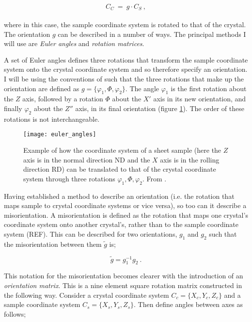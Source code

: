 \documentclass[a4paper,12pt]{report}
\numberwithin{equation}{chapter}
\begin{document}
\begin{equation}
C_C\ =\ g \cdot C_S\ ,
\end{equation}  
\\
where in this case, the sample coordinate system is rotated to that of the crystal. The orientation $g$ can be described in a number of ways. The principal methods I will use are \emph{Euler angles} and \emph{rotation matrices}.


A set of Euler angles defines three rotations that transform the sample coordinate system onto the crystal coordinate system and so therefore specify an orientation. I will be using the conventions of \cite{bunge1982texture} such that the three rotations that make up the orientation are defined as $g = \{\varphi_1,\Phi,\varphi_2\}$. The angle $\varphi_1$ is the first rotation about the $Z$ axis, followed by a rotation $\Phi$ about the $X'$ axis in its new orientation, and finally $\varphi_2$ about the $Z''$ axis, in its final orientation (figure \ref{fig:euler_angles}). The order of these rotations is not interchangeable.




\begin{figure}[h!]
  \centering
    \texttt{[image: euler\_angles]}
  \caption[Euler angle description]{Example of how the coordinate system of a sheet sample (here the $Z$ axis is in the normal direction ND and the $X$ axis is in the rolling direction RD) can be translated to that of the crystal coordinate system through three rotations $\varphi_1,\Phi,\varphi_2$. From \cite{Randle2000}.}
  \label{fig:euler_angles}
\end{figure}

Having established a method to describe an orientation (i.e. the rotation that maps sample to crystal coordinate systems or vice versa), so too can it describe a misorientation. A misorientation is defined as the rotation that maps one crystal's coordinate system onto another crystal's, rather than to the sample coordinate system (REF). This can be described for two orientations, $g_1$ and $g_2$ such that the misorientation between them $\tilde{g}$ is;

\begin{equation} \label{eq:misor_matrix}
\tilde{g} = g_1^{-1}g_2\ .
\end{equation} 

This notation for the misorientation becomes clearer with the introduction of an \emph{orientation matrix}. This is a nine element square rotation matrix constructed in the following way. Consider a crystal coordinate system $C_c = \{X_c,Y_c,Z_c\}$ and a sample coordinate system $C_s = \{X_s,Y_s,Z_s\}$. Then define angles between axes as follows;
\end{document}
